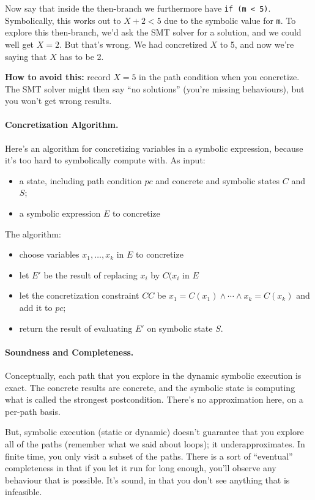 \documentclass[11pt]{article}
\begin{document}
Now say that inside the then-branch we furthermore have \texttt{if (m < 5)}.
Symbolically, this works out to $X + 2 < 5$ due to the symbolic value for \texttt{m}.
To explore this then-branch, we'd ask the SMT solver for a solution, and we could well get
$X = 2$. But that's wrong. We had concretized $X$ to 5, and now we're saying that $X$ has to be 2.

\textbf{How to avoid this:} record $X = 5$ in the path condition when you concretize. The SMT solver might then say ``no solutions'' (you're missing behaviours), but you won't get wrong results.

\paragraph{Concretization Algorithm.}
Here's an algorithm for concretizing variables in a symbolic expression, because it's too hard to symbolically compute with.
As input:
\begin{itemize}[noitemsep]
\item a state, including path condition $\mathit{pc}$ and concrete and symbolic states $C$ and $S$;
\item a symbolic expression $E$ to concretize
\end{itemize}
The algorithm:
\begin{itemize}[noitemsep]
\item choose variables $x_1, \ldots, x_k$ in $E$ to concretize
\item let $E'$ be the result of replacing $x_i$ by $C(x_i$ in $E$
\item let the concretization constraint $CC$ be $x_1 = C(x_1) \wedge \cdots \wedge x_k = C(x_k)$ and add it to $\mathit{pc}$;
\item return the result of evaluating $E'$ on symbolic state $S$.
\end{itemize}

\paragraph{Soundness and Completeness.} Conceptually, each path that you explore in the dynamic symbolic execution is exact. The concrete results are concrete, and the
symbolic state is computing what is called the strongest postcondition. There's no approximation here, on a per-path basis.

But, symbolic execution (static or dynamic) doesn't guarantee that you explore all of the paths (remember what we said about loops); it underapproximates. In finite time, you only visit a subset
of the paths. There is a sort of ``eventual'' completeness in that if you let it run for long enough, you'll observe any behaviour that is possible. It's sound, in that you don't see anything
that is infeasible.
\end{document}
